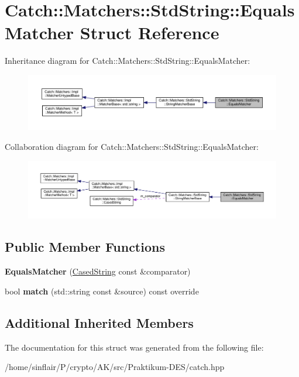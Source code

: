 \hypertarget{structCatch_1_1Matchers_1_1StdString_1_1EqualsMatcher}{}\section{Catch\+:\+:Matchers\+:\+:Std\+String\+:\+:Equals\+Matcher Struct Reference}
\label{structCatch_1_1Matchers_1_1StdString_1_1EqualsMatcher}


Inheritance diagram for Catch\+:\+:Matchers\+:\+:Std\+String\+:\+:Equals\+Matcher\+:
\nopagebreak
\begin{figure}[H]
\begin{center}
\leavevmode
\includegraphics[width=350pt]{structCatch_1_1Matchers_1_1StdString_1_1EqualsMatcher__inherit__graph}
\end{center}
\end{figure}


Collaboration diagram for Catch\+:\+:Matchers\+:\+:Std\+String\+:\+:Equals\+Matcher\+:
\nopagebreak
\begin{figure}[H]
\begin{center}
\leavevmode
\includegraphics[width=350pt]{structCatch_1_1Matchers_1_1StdString_1_1EqualsMatcher__coll__graph}
\end{center}
\end{figure}
\subsection*{Public Member Functions}
\begin{DoxyCompactItemize}
\item 
\mbox{\label{structCatch_1_1Matchers_1_1StdString_1_1EqualsMatcher_ab740f1fb2310e9fe3fed5134d4c7e4c8}} 
{\bfseries Equals\+Matcher} (\hyperlink{structCatch_1_1Matchers_1_1StdString_1_1CasedString}{Cased\+String} const \&comparator)
\item 
\mbox{\label{structCatch_1_1Matchers_1_1StdString_1_1EqualsMatcher_a0bb9d64693f7bb1ef7441062d219f21a}} 
bool {\bfseries match} (std\+::string const \&source) const override
\end{DoxyCompactItemize}
\subsection*{Additional Inherited Members}


The documentation for this struct was generated from the following file\+:\begin{DoxyCompactItemize}
\item 
/home/sinflair/\+P/crypto/\+A\+K/src/\+Praktikum-\/\+D\+E\+S/catch.\+hpp\end{DoxyCompactItemize}
